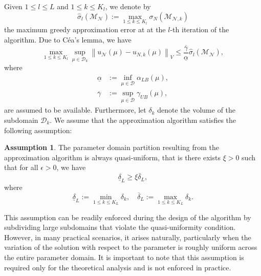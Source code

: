 \documentclass[12pt]{article}
\theoremstyle{remark}
\theoremstyle{definition}
\newtheorem{assumption}{Assumption}
\numberwithin{equation}{section}
\begin{document}
Given $1 \leq l \leq L$ and $1 \leq k \leq K_l$, we denote by 
\begin{equation}
    \hat{\sigma}_l(\mathcal{M}_{\mathcal{N}}):= \max_{1 \leq k \leq K_l} \sigma_N(\mathcal{M}_{\mathcal{N},k})
    \label{def sigma}
\end{equation}
the maximum greedy approximation error at at the $l$-th iteration of the algorithm. Due to Céa's lemma, we have 
\begin{equation}
    \max_{1 \leq k \leq K_l}\sup_{\mu \in \mathcal{D}_k} \left\|u_{\mathcal{N}}(\mu)-u_{N,k}(\mu)\right\|_V \leq  \frac{\overline{\gamma}}{\underline{\alpha}} \hat{\sigma}_l(\mathcal{M}_{\mathcal{N}}),
    \label{cea}
\end{equation}
where
\begin{align}
    \underline{\alpha} & :=\inf _{\mu \in \mathcal{D}} \alpha_{LB}(\mu), \\
    \overline{\gamma} & :=\sup _{\mu \in \mathcal{D}} \gamma_{UB}(\mu),
\end{align}
are assumed to be available. Furthermore, let $\delta_{k}$ denote the volume of the subdomain $\mathcal{D}_k$. We assume that the approximation algorithm satisfies the following assumption:
\begin{assumption}
    \label{quasi}
    The parameter domain partition resulting from the approximation algorithm is always quasi-uniform, that is there exists $\xi > 0$ such that for all $\epsilon>0$, we have
    \begin{equation}
        \underline{\delta}_L \geq \xi \overline{\delta}_L,
        \end{equation}
    where
    \begin{equation}
        \underline{\delta}_L := \min _{1 \leq k \leq K_L} \delta_{k}, \quad \overline{\delta}_L := \max _{1 \leq k \leq K_L} \delta_{k}.
    \end{equation}
\end{assumption}
This assumption can be readily enforced during the design of the algorithm by subdividing large subdomains that violate the quasi-uniformity condition. However, in many practical scenarios, it arises naturally, particularly when the variation of the solution with respect to the parameter is roughly uniform across the entire parameter domain. It is important to note that this assumption is required only for the theoretical analysis and is not enforced in practice.
\end{document}
